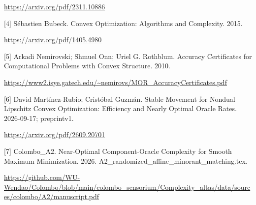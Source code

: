 \documentclass[10pt,a4paper]{article}
\begin{document}
\url{https://arxiv.org/pdf/2311.10886}



[4] Sébastien Bubeck. Convex Optimization: Algorithms and Complexity. 2015.



\url{https://arxiv.org/pdf/1405.4980}



[5] Arkadi Nemirovski; Shmuel Onn; Uriel G. Rothblum. Accuracy Certificates for Computational Problems with Convex Structure. 2010.



\url{https://www2.isye.gatech.edu/~nemirovs/MOR_AccuracyCertificates.pdf}



[6] David Martínez-Rubio; Cristóbal Guzmán. Stable Movement for Nondual Lipschitz Convex Optimization: Efficiency and Nearly Optimal Oracle Rates. 2026-09-17; preprintv1.



\url{https://arxiv.org/pdf/2609.20701}



[7] Colombo\_A2. Near-Optimal Component-Oracle Complexity for Smooth Maximum Minimization. 2026. A2\_randomized\_affine\_min\allowbreak{}orant\_matching.tex.



\url{https://github.com/WU-Wendao/Colombo/blob/main/colombo_sensorium/Complexity_altas/data/sources/colombo/A2/manuscript.pdf}
\end{document}

